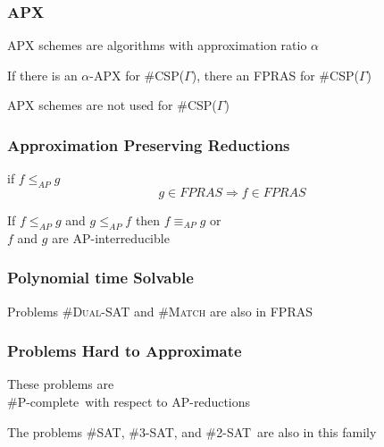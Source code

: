 \documentclass[a4paper,handout]{beamer}
\newcommand{\pname}[1]{\textsc{#1}}
\newcommand{\ccsp}{\#CSP}
\newcommand{\cpc}{\#P-complete}
\newcommand{\csat}{\#SAT}
\newcommand{\ctsat}{\#3-SAT}
\newcommand{\cdsat}{\#2-SAT}
\newcommand{\cisp}{\#IS}
\newcommand{\aple}{\le_{AP}}
\newcommand{\apeq}{\equiv_{AP}}
\theoremstyle{definition}
\begin{document}
\begin{frame}
\frametitle{APX}
APX schemes are algorithms with approximation ratio \(\alpha\) \\
\vskip 12pt
\pause
\begin{theorem}
If there is an \(\alpha\)-APX for \ccsp(\(\Gamma\)), there an FPRAS for \ccsp(\(\Gamma\))
\end{theorem}
\vskip 12pt
APX schemes are not used for \ccsp(\(\Gamma\))
\end{frame}

\begin{frame}
\frametitle{Approximation Preserving Reductions}
\begin{definition}[AP-reduction]
if \(f \aple g\) \\
\[g \in FPRAS \Rightarrow f \in FPRAS\]
\end{definition}

\pause
If \(f \aple g\) and \(g \aple f\) then \(f \apeq g\) or \\
\(f\) and \(g\) are \textcolor{mygreen}{AP-interreducible}
\end{frame}

\begin{frame}
\frametitle{Polynomial time Solvable}
\begin{center}
\end{center}

\pause
Problems \pname{\#Dual-SAT} and \pname{\#Match} are also in FPRAS
\end{frame}

\begin{frame}
\frametitle{Problems Hard to Approximate}
These problems are \\
\cpc\ with respect to AP-reductions \\
\begin{center}
\end{center}
\vskip 12pt
\pause
The problems \csat, \ctsat, and \cdsat\ are also in this family
\end{frame}
\end{document}
